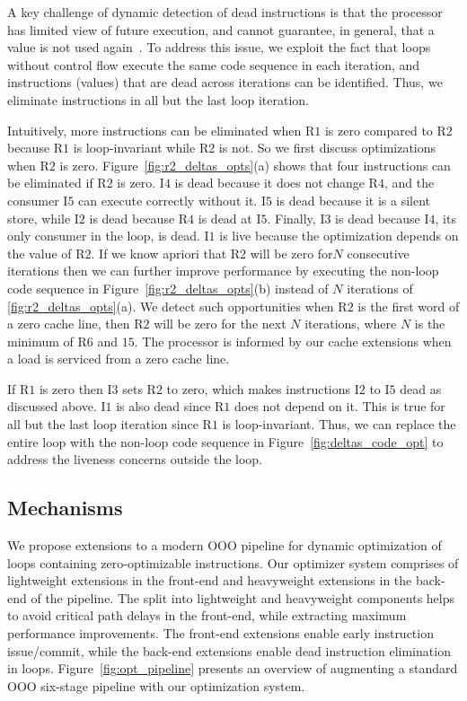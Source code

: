 A key challenge of dynamic detection of dead instructions is that the processor has limited view of future execution, and cannot guarantee, in general, that a value is not used again~\cite{Butts02}.  To address this issue, we exploit the fact that loops without control flow execute the same code sequence in each iteration, and instructions (values) that are dead across iterations can be identified. Thus, we eliminate instructions in all but the last loop iteration. 

Intuitively, more instructions can be eliminated when R$1$ is zero compared to R$2$ because R$1$ is loop-invariant while R$2$ is not.  So we first discuss optimizations when R$2$ is zero.  Figure~\ref{fig:r2_deltas_opts}(a) shows that four instructions can be eliminated if R$2$ is zero.  I$4$ is dead because it does not change R$4$, and the consumer I$5$ can execute correctly without it.  I$5$ is dead because it is a silent store, while I$2$ is dead because R$4$ is dead at I$5$.  Finally, I$3$ is dead because I$4$,  its only consumer in the loop,  is dead.  I$1$ is live because the optimization depends on the value of R$2$.  If we know apriori that R$2$ will be zero for$N$ consecutive iterations then we can further improve performance by executing the non-loop code sequence in Figure~\ref{fig:r2_deltas_opts}(b)  instead of $N$ iterations of \ref{fig:r2_deltas_opts}(a).   We detect such opportunities when R$2$ is the first word of a zero cache line, then R$2$ will be zero for the next $N$ iterations, where $N$ is the minimum of R$6$ and $15$.  The processor is informed by our cache extensions when a load is serviced from a zero cache line.

If R$1$ is zero then I$3$ sets R$2$ to zero, which makes instructions I$2$ to I$5$ dead as discussed above.  I$1$ is also dead since R$1$ does not depend on it.  This is true for all but the last loop iteration since R$1$ is loop-invariant.  Thus, we can replace the entire loop with the non-loop code sequence in Figure~\ref{fig:deltas_code_opt} to address the liveness concerns outside the loop.  

\subsection{Mechanisms}
We propose extensions to a modern OOO pipeline for dynamic optimization of loops containing zero-optimizable instructions.  Our optimizer system comprises of lightweight extensions in the front-end and heavyweight extensions in the back-end of the pipeline.  The split into lightweight and heavyweight components helps to avoid critical path delays in the front-end, while extracting maximum performance improvements.  The front-end extensions enable early instruction issue/commit, while the back-end extensions enable dead instruction elimination in loops.  Figure~\ref{fig:opt_pipeline} presents an overview of augmenting a standard OOO six-stage pipeline with our optimization system.

